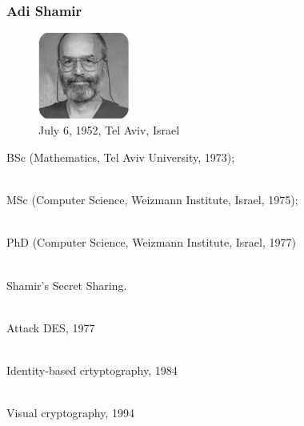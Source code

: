 \documentclass[slidestop,compress,mathserif]{beamer}
\begin{document}
\begin{frame}
  \frametitle{Adi Shamir}
  \begin{multicols}{2}
    \begin{minipage}[c]{0.5\textwidth}
      \begin{figure}[H]
        \includegraphics[width=3cm]{s.png}
        \caption{July 6, 1952, Tel Aviv, Israel}
      \end{figure}
    \end{minipage}
\footnotesize
    BSc (Mathematics, Tel Aviv University, 1973); 
   
    ~\\

    MSc (Computer Science, Weizmann Institute, Israel, 1975); 
    
    ~\\

    PhD (Computer Science, Weizmann Institute, Israel, 1977)    

    ~\\

    Shamir's Secret Sharing.

    ~\\

    Attack DES, 1977

    ~\\

    Identity-based crtyptography, 1984

    ~\\

    Visual cryptography, 1994

  \end{multicols}
  
\end{frame}
\end{document}
